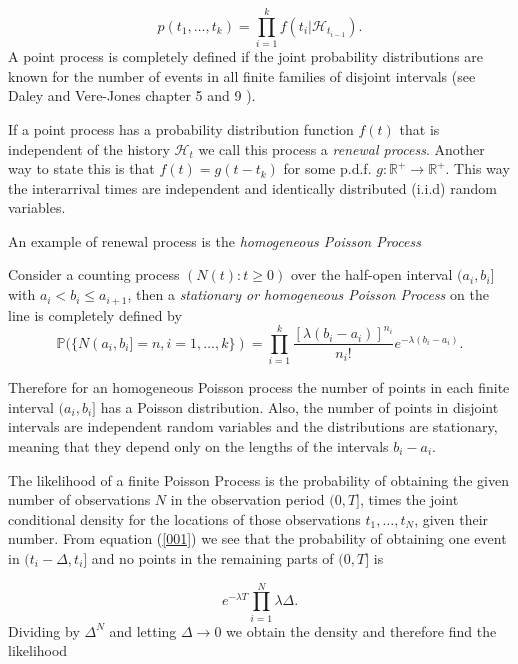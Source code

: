 \begin{equation}\label{eq:JointDensHawkes}
    p(t_1, \dots, t_k) = \prod_{i=1}^k f(t_i | \mathcal{H}_{t_{i-1}}).
\end{equation}
A point process is completely defined if the joint probability distributions are known for the number of events in all finite families of disjoint intervals (see Daley and Vere-Jones chapter 5 and 9 \cite{Daley}).

If a point process has a probability distribution function $f(t)$ that is independent of the history $\mathcal{H}_t$ we call this process a \textit{renewal process}. Another way to state this is that $f(t) = g(t - t_k)$ for some p.d.f. $g : \mathbb{R}^+ \rightarrow \mathbb{R}^+$. This way the interarrival times are independent and identically distributed (i.i.d) random variables.

An example of renewal process is the \textit{homogeneous Poisson Process}

\begin{definition}\label{def:HomPoi}
    Consider a counting process $(N(t):t \geq 0)$ over the half-open interval $(a_i, b_i]$ with $a_i < b_i \leq a_{i+1}$, then a \textit{stationary or homogeneous Poisson Process} on the line is completely defined by
    \begin{equation}\label{001}
        \mathbb{P}(\{N(a_i, b_i] = n, i = 1, \dots, k \}) = \prod_{i=1}^k \frac{[\lambda(b_i - a_i)]^{n_i}}{n_i!}e^{-\lambda(b_i-a_i)}.
    \end{equation}
\end{definition}
    
Therefore for an homogeneous Poisson process the number of points in each finite interval $(a_i, b_i]$ has a Poisson distribution. Also, the number of points in disjoint intervals are independent random variables and the distributions are stationary, meaning that they depend only on the lengths of the intervals $b_i - a_i$.

The likelihood of a finite Poisson Process is the probability of obtaining the given number of observations $N$ in the observation period $(0,T]$, times the joint conditional density for the locations of those observations $t_1, \dots, t_N$, given their number. From equation (\ref{001}) we see that the probability of obtaining one event in $(t_i - \Delta, t_i]$ and no points in the remaining parts of $(0, T]$ is

\begin{equation*}
    e^{-\lambda T} \prod_{i=1}^N \lambda \Delta.
\end{equation*}
Dividing by $\Delta^N$ and letting $\Delta \rightarrow 0$ we obtain the density and therefore find the likelihood

